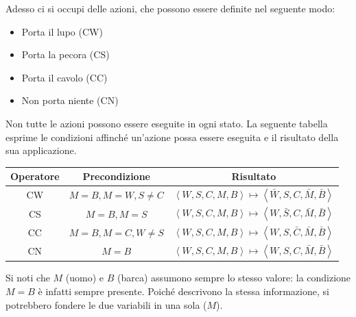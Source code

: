 \documentclass[a4paper, 11pt, oneside]{book}
\theoremstyle{definition}
\begin{document}
    Adesso ci si occupi delle azioni, che possono essere definite nel seguente modo:
    \begin{itemize}
        \item Porta il lupo (CW)
        \item Porta la pecora (CS)
        \item Porta il cavolo (CC)
        \item Non porta niente (CN)
    \end{itemize}

    Non tutte le azioni possono essere eseguite in ogni stato. La seguente tabella esprime
    le condizioni affinch\'e un'azione possa essere eseguita e il risultato della sua
    applicazione.
    \begin{center}
        \begin{tabular} { |c|c|c| }
            \hline
            Operatore & Precondizione & Risultato\\
            \hline
            CW &  \( M = B, M = W, S \neq C \) & 
            \( \left<W,S,C,M,B\right> \mapsto 
            \left<\bar{W},S,C,\bar{M},\bar{B}\right> \)\\
            CS &  \( M = B, M = S \) &
            \( \left<W,S,C,M,B\right> \mapsto 
            \left<W,\bar{S},C,\bar{M},\bar{B}\right> \)\\
            CC &  \( M = B, M = C, W \neq S \) & 
            \( \left<W,S,C,M,B\right> \mapsto 
            \left<W,S,\bar{C},\bar{M},\bar{B}\right> \)\\
            CN &  \( M = B \) & 
            \( \left<W,S,C,M,B\right> \mapsto 
            \left<W,S,C,\bar{M},\bar{B}\right> \)\\
            \hline
        \end{tabular}
    \end{center}

    Si noti che $M$ (uomo) e $B$ (barca) assumono sempre lo stesso valore: la condizione
    $M = B$ \`e infatti sempre presente. Poich\'e descrivono la stessa informazione, si
    potrebbero fondere le due variabili in una sola ($M$).
\end{document}
